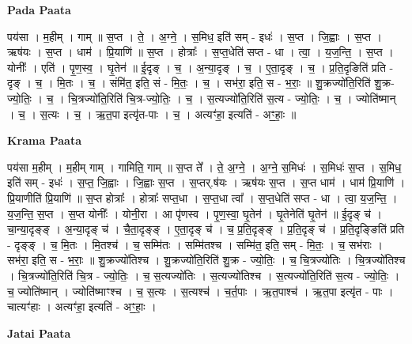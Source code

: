 \documentclass[17pt]{extarticle}
\begin{document}
\textbf{Pada Paata} \newline

पय॑सा । म॒हीम् । गाम् ॥ स॒प्त । ते॒ । अ॒ग्ने॒ । स॒मिध॒ इति॑ सम् - इधः॑ । स॒प्त । जि॒ह्वाः । स॒प्त । ऋष॑यः । स॒प्त । धाम॑ । प्रि॒याणि॑ ॥ स॒प्त । होत्राः᳚ । स॒प्त॒धेति॑ सप्त - धा । त्वा॒ । य॒ज॒न्ति॒ । स॒प्त । योनीः᳚ । एति॑ । पृ॒ण॒स्व॒ । घृ॒तेन॑ ॥ ई॒दृङ् । च॒ । अ॒न्या॒दृङ् । च॒ । ए॒ता॒दृङ् । च॒ । प्र॒ति॒दृङिति॑ प्रति - दृङ् । च॒ । मि॒तः । च॒ । संमि॑त॒ इति॒ सं - मि॒तः॒ । च॒ । सभ॑रा॒ इति॒ स - भ॒राः॒ ॥ शु॒क्रज्यो॑ति॒रिति॑ शु॒क्र-ज्यो॒तिः॒ । च॒ । चि॒त्रज्यो॑ति॒रिति॑ चि॒त्र-ज्यो॒तिः॒ । च॒ । स॒त्यज्यो॑ति॒रिति॑ स॒त्य - ज्यो॒तिः॒ । च॒ । ज्योति॑ष्मान् । च॒ । स॒त्यः । च॒ । ऋ॒त॒पा इत्यृ॑त-पाः । च॒ । अत्यꣳ॑हा॒ इत्यति॑ - अꣳ॒॒हाः॒ ॥  \newline


\textbf{Krama Paata} \newline

पय॑सा म॒हीम् । म॒हीम् गाम् । गामिति॒ गाम् ॥ स॒प्त ते᳚ । ते॒ अ॒ग्ने॒ । अ॒ग्ने॒ स॒मिधः॑ । स॒मिधः॑ स॒प्त । स॒मिध॒ इति॑ सम् - इधः॑ । स॒प्त॒ जि॒ह्वाः । जि॒ह्वाः स॒प्त । स॒प्तर्.ष॑यः । ऋष॑यः स॒प्त । स॒प्त धाम॑ । धाम॑ प्रि॒याणि॑ । प्रि॒याणीति॑ प्रि॒याणि॑ ॥ स॒प्त होत्राः᳚ । होत्राः᳚ सप्त॒धा । स॒प्त॒धा त्वा᳚ । स॒प्त॒धेति॑ सप्त - धा । त्वा॒ य॒ज॒न्ति॒ । य॒ज॒न्ति॒ स॒प्त । स॒प्त योनीः᳚ । योनी॒रा । आ पृ॑णस्व । पृ॒ण॒स्वा॒ घृ॒तेन॑ । घृ॒तेनेति॑ घृ॒तेन॑ ॥ ई॒दृङ् च॑ । चा॒न्या॒दृङ्ङ् । अ॒न्या॒दृङ् च॑ । चै॒ता॒दृङ्ङ् । ए॒ता॒दृङ् च॑ । च॒ प्र॒ति॒दृङ्ङ् । प्र॒ति॒दृङ् च॑ । प्र॒ति॒दृङ्ङिति॑ प्रति - दृङ्ङ् । च॒ मि॒तः । मि॒तश्च॑ । च॒ सम्मि॑तः । सम्मि॑तश्च । सम्मि॑त॒ इति॒ सम् - मि॒तः॒ । च॒ सभ॑राः । सभ॑रा॒ इति॒ स - भ॒राः॒ ॥ शु॒क्रज्यो॑तिश्च । शु॒क्रज्यो॑ति॒रिति॑ शु॒क्र - ज्यो॒तिः॒ । च॒ चि॒त्रज्यो॑तिः । चि॒त्रज्यो॑तिश्च । चि॒त्रज्यो॑ति॒रिति॑ चि॒त्र - ज्यो॒तिः॒ । च॒ स॒त्यज्यो॑तिः । स॒त्यज्यो॑तिश्च । स॒त्यज्यो॑ति॒रिति॑ स॒त्य - ज्यो॒तिः॒ । च॒ ज्योति॑ष्मान् । ज्योति॑ष्माꣳश्च । च॒ स॒त्यः । स॒त्यश्च॑ । च॒र्त॒पाः । ऋ॒त॒पाश्च॑ । ऋ॒त॒पा इत्यृ॑त - पाः । चात्यꣳ॑हाः । अत्यꣳ॑हा॒ इत्यति॑ - अꣳ॒॒हाः॒ । \newline

\textbf{Jatai Paata} \newline
\end{document}
